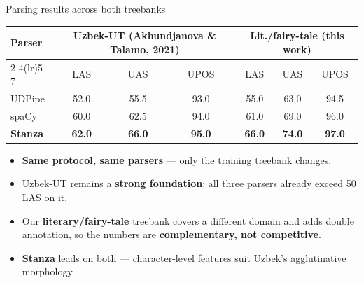 \documentclass[10pt,aspectratio=169]{beamer}
\begin{document}
\begin{frame}{Parsing results across both treebanks}
   \centering
   \begin{tabular}{lccc|ccc}
      \toprule
      \textbf{Parser} & \multicolumn{3}{c|}{\textbf{Uzbek-UT (Akhundjanova \& Talamo, 2021)}} & \multicolumn{3}{c}{\textbf{Lit./fairy-tale (this work)}}\\
      \cmidrule(lr){2-4}\cmidrule(lr){5-7}
                     & LAS  & UAS  & UPOS & LAS  & UAS  & UPOS\\
      \midrule
      UDPipe         & 52.0 & 55.5 & 93.0 & 55.0 & 63.0 & 94.5\\
      spaCy          & 60.0 & 62.5 & 94.0 & 61.0 & 69.0 & 96.0\\
      \textbf{Stanza}& \textbf{62.0} & \textbf{66.0} & \textbf{95.0} & \textbf{66.0} & \textbf{74.0} & \textbf{97.0}\\
      \bottomrule
   \end{tabular}
   \vspace{0.6em}

   \begin{itemize}\small
      \item \textbf{Same protocol, same parsers} — only the training treebank changes.
      \item Uzbek-UT remains a \textbf{strong foundation}: all three parsers already exceed 50 LAS on it.
      \item Our \textbf{literary/fairy-tale} treebank covers a different domain and adds double annotation, so the numbers are \textbf{complementary, not competitive}.
      \item \textbf{Stanza} leads on both — character-level features suit Uzbek's agglutinative morphology.
   \end{itemize}
\end{frame}
\end{document}
